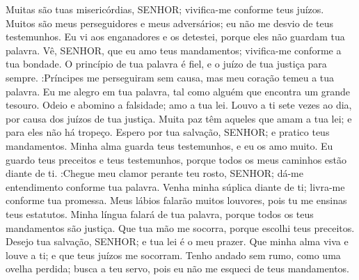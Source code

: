{Muitas são tuas misericórdias, SENHOR; vivifica-me conforme teus juízos.
Muitos são meus perseguidores e meus adversários;
{} eu não me desvio de teus testemunhos.
Eu vi aos enganadores e os detestei, porque eles não guardam tua palavra.
Vê, SENHOR, que eu amo teus mandamentos; vivifica-me conforme a tua bondade.
O princípio de tua palavra é fiel, e o juízo de tua justiça
{} para sempre.
 :Príncipes me perseguiram sem causa, mas meu coração temeu a tua palavra.
Eu me alegro em tua palavra, tal como alguém que encontra um grande tesouro.
Odeio e abomino a falsidade;
{} amo a tua lei.
Louvo a ti sete vezes ao dia, por causa dos juízos de tua justiça.
Muita paz têm aqueles que amam a tua lei; e para eles não há tropeço.
Espero por tua salvação, SENHOR; e pratico teus mandamentos.
Minha alma guarda teus testemunhos, e eu os amo muito.
Eu guardo teus preceitos e teus testemunhos, porque todos os meus caminhos estão diante de ti.
 :Chegue meu clamor perante teu rosto, SENHOR; dá-me entendimento conforme tua palavra.
Venha minha súplica diante de ti; livra-me conforme tua promessa.
Meus lábios falarão muitos louvores, pois tu me ensinas teus estatutos.
Minha língua falará de tua palavra, porque todos os teus mandamentos são justiça.
Que tua mão me socorra, porque escolhi
{} teus preceitos.
Desejo tua salvação, SENHOR; e tua lei é o meu prazer.
Que minha alma viva e louve a ti; e que teus juízos me socorram.
Tenho andado sem rumo, como uma ovelha perdida; busca a teu servo, pois eu não me esqueci de teus mandamentos.

\par }

